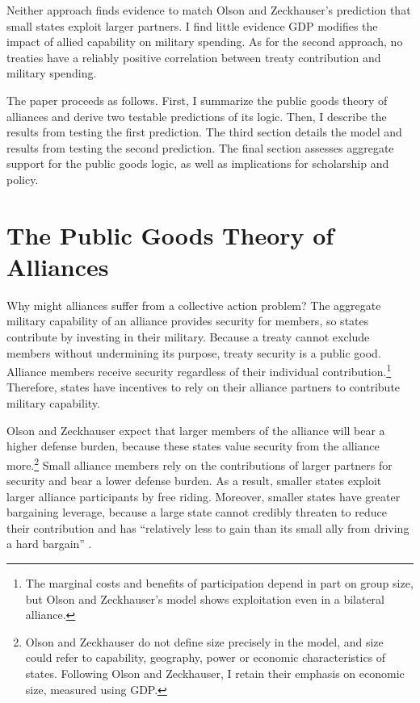 \documentclass[12pt]{article}
\begin{document}
Neither approach finds evidence to match Olson and Zeckhauser's prediction that small states exploit larger partners. 
I find little evidence GDP modifies the impact of allied capability on military spending.
As for the second approach, no treaties have a reliably positive correlation between treaty contribution and military spending. 


The paper proceeds as follows.
First, I summarize the public goods theory of alliances and derive two testable predictions of its logic.
Then, I describe the results from testing the first prediction.
The third section details the model and results from testing the second prediction. 
The final section assesses aggregate support for the public goods logic, as well as implications for scholarship and policy. 



\section{The Public Goods Theory of Alliances}


Why might alliances suffer from a collective action problem?
The aggregate military capability of an alliance provides security for members, so states contribute by investing in their military.
Because a treaty cannot exclude members without undermining its purpose, treaty security is a public good. 
Alliance members receive security regardless of their individual contribution.\footnote{The marginal costs and benefits of participation depend in part on group size, but Olson and Zeckhauser's model shows exploitation even in a bilateral alliance.}
Therefore, states have incentives to rely on their alliance partners to contribute military capability. 

 
Olson and Zeckhauser expect that larger members of the alliance will bear a higher defense burden, because these states value security from the alliance more.\footnote{Olson and Zeckhauser do not define size precisely in the model, and size could refer to capability, geography, power or economic characteristics of states. Following Olson and Zeckhauser, I retain their emphasis on economic size, measured using GDP.}
Small alliance members rely on the contributions of larger partners for security and bear a lower defense burden.
As a result, smaller states exploit larger alliance participants by free riding. 
Moreover, smaller states have greater bargaining leverage, because a large state cannot credibly threaten to reduce their contribution and has ``relatively less to gain than its small ally from driving a hard bargain'' \citep[pg. 274]{OlsonZeckhauser1966}. 
\end{document}
